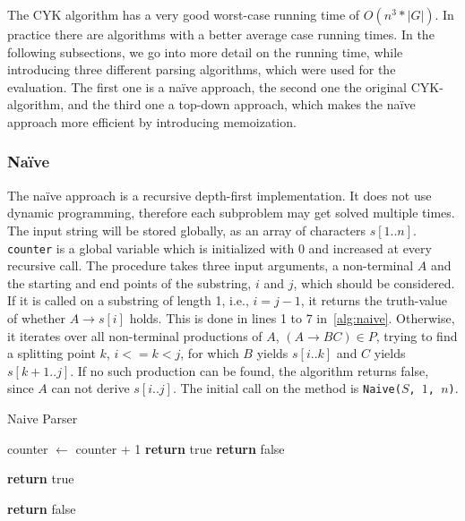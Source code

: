 The CYK algorithm has a very good worst-case running time of $O(n^3 * |G|)$.
In practice there are algorithms with a better average case running times.
In the following subsections, we go into more detail on the running time, while introducing three different parsing algorithms, which were used for the evaluation.
The first one is a na\"{i}ve approach, the second one the original CYK-algorithm, and the third one a top-down approach, which makes the na\"{i}ve approach more efficient by introducing memoization.

\subsubsection{Na\"{i}ve}

The na\"{i}ve approach is a recursive depth-first implementation.
It does not use dynamic programming, therefore each subproblem may get solved multiple times.
The input string will be stored globally, as an array of characters $s[1..n]$.
\texttt{counter} is a global variable which is initialized with $0$ and increased at every recursive call.
The procedure takes three input arguments, a non-terminal $A$ and the starting and end points of the substring, $i$ and $j$, which should be considered.
If it is called on a substring of length 1, i.e., $i = j-1$, it returns the truth-value of whether $A\rightarrow s[i]$ holds.
This is done in lines 1 to 7 in~\ref{alg:naive}.
Otherwise, it iterates over all non-terminal productions of $A$, $(A\rightarrow BC) \in P$, trying to find a splitting point $k$, $i <= k < j$, for which $B$ yields $s[i..k]$ and $C$ yields $s[k+1..j]$.
If no such production can be found, the algorithm returns false, since $A$ can not derive $s[i..j]$.
The initial call on the method is \texttt{Naive($S$, $1$, $n$)}.

\begin{algorithm}[H]
    \caption{Naive Parser}
    \label{alg:naive}
    \begin{algorithmic}[1]
        \State counter $\leftarrow$ counter + 1
                \State \textbf{return} true
            \Else
                \State \textbf{return} false
            \EndIf
        \EndIf

                    \State \textbf{return} true
                \EndIf
            \EndFor
        \EndFor

        \State \textbf{return} false
        \EndFunction
    \end{algorithmic}
\end{algorithm}

